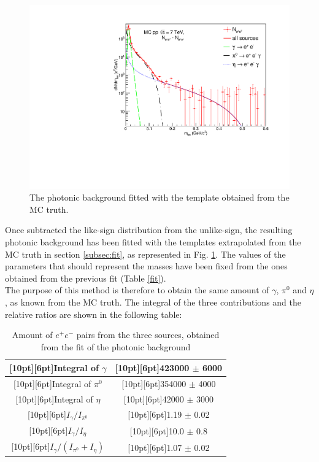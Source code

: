 \documentclass[a4paper,twocolumn,gsifonts,twoside]{gsipaper}
\begin{document}
\begin{figure}[tb]
\center
\includegraphics[scale=0.7]{esd_comb.pdf}
\caption{The photonic background fitted with the template obtained from the MC truth.}
\label{photonic}
\end{figure}

Once subtracted the like-sign distribution from the unlike-sign, the resulting photonic background has been fitted with the templates 
extrapolated from the MC truth in section \ref{subsec:fit}, as represented in Fig. \ref{photonic}.
The values of the parameters that should represent the masses have been fixed from the ones obtained from the previous fit (Table 
\ref{fit}).\\
The purpose of this method is therefore to obtain the same amount of $\gamma$, \space $\pi^{0}$ and $\eta$, as known from the MC truth.
The integral of the three contributions and the relative ratios are shown in the following table:

\begin{table}[htpb]
\center
\caption{Amount of $e^{+}e^{-}$ pairs from the three sources, obtained from the fit of the photonic background}\label{fit2}
\begin{tabular}{|c|c|}
  \hline
  \raisebox{0pt}[10pt][6pt]{Integral of $\gamma$ } &
  \raisebox{0pt}[10pt][6pt]{423000 $\pm$ 6000} \\
  \hline
  \raisebox{0pt}[10pt][6pt]{Integral of $\pi^{0}$ } &
  \raisebox{0pt}[10pt][6pt]{354000 $\pm$ 4000} \\
  \hline
  \raisebox{0pt}[10pt][6pt]{Integral of $\eta$ } &
  \raisebox{0pt}[10pt][6pt]{42000 $\pm$ 3000} \\
  \hline
  \raisebox{0pt}[10pt][6pt]{$I_{\gamma}/I_{\pi^{0}}$} &
  \raisebox{0pt}[10pt][6pt]{1.19 $\pm$ 0.02} \\
  \hline
  \raisebox{0pt}[10pt][6pt]{$I_{\gamma}/I_{\eta}$} &
  \raisebox{0pt}[10pt][6pt]{10.0 $\pm$ 0.8} \\
  \hline
  \raisebox{0pt}[10pt][6pt]{$I_{\gamma}/(I_{\pi^{0}}+I_{\eta})$} &
  \raisebox{0pt}[10pt][6pt]{1.07 $\pm$ 0.02} \\
  \hline
  \end{tabular}
\end{table}
\end{document}
